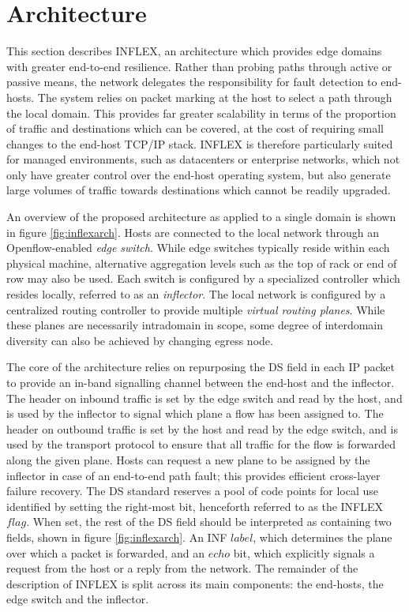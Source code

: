 \section{Architecture}
\label{section:inflex:arch}

This section describes INFLEX, an architecture which provides edge domains with greater end-to-end resilience.
Rather than probing paths through active or passive means, the network delegates the responsibility for fault detection to end-hosts.
The system relies on packet marking at the host to select a path through the local domain.
This provides far greater scalability in terms of the proportion of traffic and destinations which can be covered, at the cost of requiring small changes to the end-host \ac{TCP}/\ac{IP} stack.
INFLEX is therefore particularly suited for managed environments, such as datacenters or enterprise networks, which not only have greater control over the end-host operating system, but also generate large volumes of traffic towards destinations which cannot be readily upgraded.

An overview of the proposed architecture as applied to a single domain is shown in figure \ref{fig:inflexarch}.
Hosts are connected to the local network through an Openflow-enabled \emph{edge switch}.
While edge switches typically reside within each physical machine, alternative aggregation levels such as the top of rack or end of row may also be used.
Each switch is configured by a specialized controller which resides locally, referred to as an \emph{inflector}.
The local network is configured by a centralized routing controller to provide multiple \emph{virtual routing planes}.
While these planes are necessarily intradomain in scope, some degree of interdomain diversity can also be achieved by changing egress node.

The core of the architecture relies on repurposing the \ac{DS} field in each \ac{IP} packet to provide an in-band signalling channel between the end-host and the inflector.
The header on inbound traffic is set by the edge switch and read by the host, and is used by the inflector to signal which plane a flow has been assigned to.
The header on outbound traffic is set by the host and read by the edge switch, and is used by the transport protocol to ensure that all traffic for the flow is forwarded along the given plane.
Hosts can request a new plane to be assigned by the inflector in case of an end-to-end path fault; this provides efficient cross-layer failure recovery.
The \ac{DS} standard \cite{Blake:1998p370} reserves a pool of code points for local use identified by setting the right-most bit, henceforth referred to as the INFLEX $flag$.
When set, the rest of the \ac{DS} field should be interpreted as containing two fields, shown in figure \ref{fig:inflexarch}. 
An \ac{INF} $label$, which determines the plane over which a packet is forwarded, and an $echo$ bit, which explicitly signals a request from the host or a reply from the network.
The remainder of the description of INFLEX is split across its main components: the end-hosts, the edge switch and the inflector.

